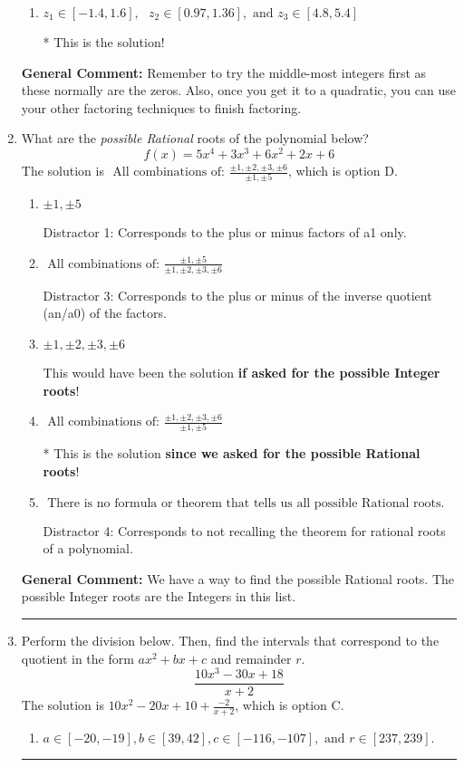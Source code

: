\documentclass{extbook}[14pt]
\newcommand{\litem}[1]{\item #1

\rule{\textwidth}{0.4pt}}
\begin{document}
\begin{enumerate}
{\begin{enumerate}[label=\Alph*.]
 Distractor 4: Corresponds to moving factors from one rational to another.
\item \( z_1 \in [-1.4, 1.6], \text{   }  z_2 \in [0.97, 1.36], \text{   and   } z_3 \in [4.8, 5.4] \)

* This is the solution!
\end{enumerate}

\textbf{General Comment:} Remember to try the middle-most integers first as these normally are the zeros. Also, once you get it to a quadratic, you can use your other factoring techniques to finish factoring.
}
\litem{
What are the \textit{possible Rational} roots of the polynomial below?
\[ f(x) = 5x^{4} +3 x^{3} +6 x^{2} +2 x + 6 \]The solution is \( \text{ All combinations of: }\frac{\pm 1,\pm 2,\pm 3,\pm 6}{\pm 1,\pm 5} \), which is option D.\begin{enumerate}[label=\Alph*.]
\item \( \pm 1,\pm 5 \)

 Distractor 1: Corresponds to the plus or minus factors of a1 only.
\item \( \text{ All combinations of: }\frac{\pm 1,\pm 5}{\pm 1,\pm 2,\pm 3,\pm 6} \)

 Distractor 3: Corresponds to the plus or minus of the inverse quotient (an/a0) of the factors. 
\item \( \pm 1,\pm 2,\pm 3,\pm 6 \)

This would have been the solution \textbf{if asked for the possible Integer roots}!
\item \( \text{ All combinations of: }\frac{\pm 1,\pm 2,\pm 3,\pm 6}{\pm 1,\pm 5} \)

* This is the solution \textbf{since we asked for the possible Rational roots}!
\item \( \text{ There is no formula or theorem that tells us all possible Rational roots.} \)

 Distractor 4: Corresponds to not recalling the theorem for rational roots of a polynomial.
\end{enumerate}

\textbf{General Comment:} We have a way to find the possible Rational roots. The possible Integer roots are the Integers in this list.
}
\litem{
Perform the division below. Then, find the intervals that correspond to the quotient in the form $ax^2+bx+c$ and remainder $r$.
\[ \frac{10x^{3} -30 x + 18}{x + 2} \]The solution is \( 10x^{2} -20 x + 10 + \frac{-2}{x + 2} \), which is option C.\begin{enumerate}[label=\Alph*.]
\item \( a \in [-20, -19], b \in [39, 42], c \in [-116, -107], \text{ and } r \in [237, 239]. \)


\end{enumerate}}
\end{enumerate}
\end{document}
